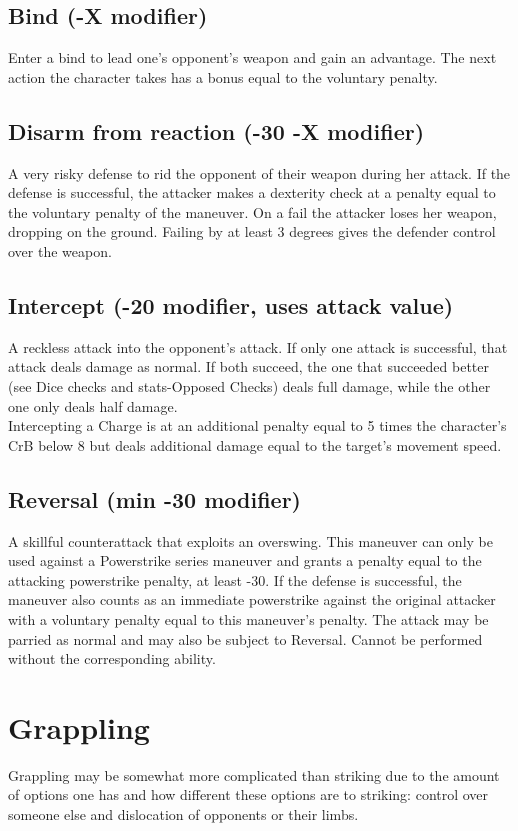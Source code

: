 \subsection*{Bind (-X modifier)}
Enter a bind to lead one’s opponent’s weapon and gain an advantage. The next action the character takes has a bonus equal to the voluntary penalty.
\subsection*{Disarm from reaction (-30 -X modifier)}
A very risky defense to rid the opponent of their weapon during her attack. If the defense is successful, the attacker makes a dexterity check at a penalty equal to the voluntary penalty of the maneuver. On a fail the attacker loses her weapon, dropping on the ground. Failing by at least 3 degrees gives the defender control over the weapon.
\subsection*{Intercept (-20 modifier, uses attack value)}
A reckless attack into the opponent's attack. If only one attack is successful, that attack deals damage as normal. If both succeed, the one that succeeded better (see Dice checks and stats-Opposed Checks) deals full damage, while the other one only deals half damage.\\
Intercepting a Charge is at an additional penalty equal to 5 times the character’s CrB below 8 but deals additional damage equal to the target’s movement speed.
\subsection*{Reversal (min -30 modifier)}
A skillful counterattack that exploits an overswing. This maneuver can only be used against a Powerstrike series maneuver and grants a penalty equal to the attacking powerstrike penalty, at least -30. If the defense is successful, the maneuver also counts as an immediate powerstrike against the original attacker with a voluntary penalty equal to this maneuver’s penalty. The attack may be parried as normal and may also be subject to Reversal. Cannot be performed without the corresponding ability.

\section{Grappling}
Grappling may be somewhat more complicated than striking due to the amount of options one has and how different these options are to striking: control over someone else and dislocation of opponents or their limbs.
